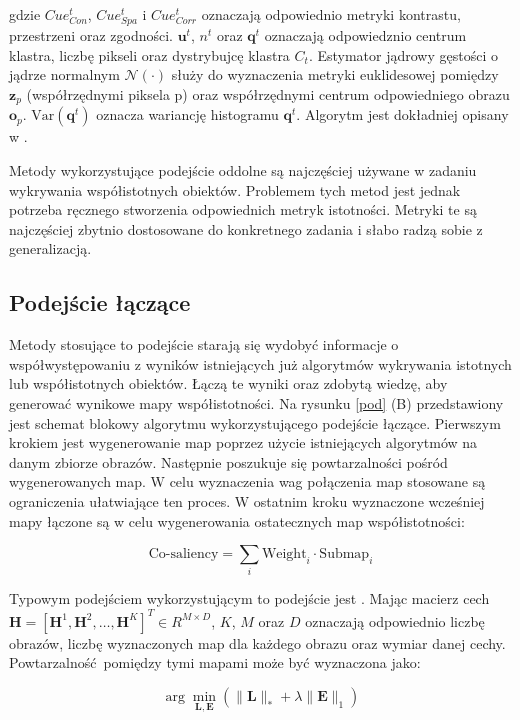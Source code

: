 \documentclass[a4paper,12pt,twoside,openany]{report}
\begin{document}
	gdzie $Cue^t_{Con}$, $Cue^t_{Spa}$ i $Cue^t_{Corr}$ oznaczają odpowiednio metryki kontrastu, przestrzeni oraz zgodności. $\mathbf{u}^t$, $n^t$ oraz $\mathbf{q}^t$ oznaczają odpowiedznio centrum klastra, liczbę pikseli oraz dystrybujcę klastra $C_t$. Estymator jądrowy gęstości o jądrze normalnym $\mathcal{N}(\cdot)$ służy do wyznaczenia metryki euklidesowej pomiędzy $\mathbf{z}_p$ (współrzędnymi piksela p) oraz współrzędnymi centrum odpowiedniego obrazu $\mathbf{o}_p$. $\text{Var}\left(\mathbf{q}^t\right)$ oznacza wariancję histogramu $\mathbf{q}^t$. Algorytm jest dokładniej opisany w \cite{bott}.

	Metody wykorzystujące podejście oddolne są najczęściej używane w zadaniu wykrywania współistotnych obiektów. Problemem tych metod jest jednak potrzeba ręcznego stworzenia odpowiednich metryk istotności. Metryki te są najczęściej zbytnio dostosowane do konkretnego zadania i słabo radzą sobie z generalizacją.

	\subsection{Podejście łączące}
	Metody stosujące to podejście starają się wydobyć informacje o współwystępowaniu z wyników istniejących już algorytmów wykrywania istotnych lub współistotnych obiektów. Łączą te wyniki oraz zdobytą wiedzę, aby generować wynikowe mapy współistotności. Na rysunku \ref{pod} (B) przedstawiony jest schemat blokowy algorytmu wykorzystującego podejście łączące. Pierwszym krokiem jest wygenerowanie map poprzez użycie istniejących algorytmów na danym zbiorze obrazów. Następnie poszukuje się powtarzalności pośród wygenerowanych map. W celu wyznaczenia wag połączenia map stosowane są ograniczenia ułatwiające ten proces. W ostatnim kroku wyznaczone wcześniej mapy łączone są w celu wygenerowania ostatecznych map współistotności:

	$$
	\text{Co-saliency} = \sum_i \text{Weight}_i \cdot \text{Submap}_i
	$$

	Typowym podejściem wykorzystującym to podejście jest \cite{midfeatex}. Mając macierz cech $\mathbf{H} = [\mathbf{H}^1, \mathbf{H}^2, \dots, \mathbf{H}^K]^T \in R^{M \times D}$, $K$, $M$ oraz $D$ oznaczają odpowiednio liczbę obrazów, liczbę wyznaczonych map dla każdego obrazu oraz wymiar danej cechy. Powtarzalność pomiędzy tymi mapami może być wyznaczona jako:

	$$
	\arg\min_{\mathbf{L}, \mathbf{E}} \left(\|\mathbf{L}\|_* + \lambda\|\mathbf{E}\|_1\right)
	$$
\end{document}
